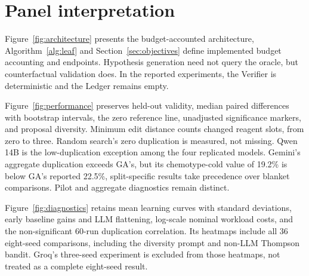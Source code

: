\section{Panel interpretation}
Figure~\ref{fig:architecture} presents the budget-accounted architecture, Algorithm~\ref{alg:leaf} and Section~\ref{sec:objectives} define implemented budget accounting and endpoints. Hypothesis generation need not query the oracle, but counterfactual validation does. In the reported experiments, the Verifier is deterministic and the Ledger remains empty.

Figure~\ref{fig:performance} preserves held-out validity, median paired differences with bootstrap intervals, the zero reference line, unadjusted significance markers, and proposal diversity. Minimum edit distance counts changed reagent slots, from zero to three. Random search's zero duplication is measured, not missing. Qwen 14B is the low-duplication exception among the four replicated models. Gemini's aggregate duplication exceeds GA's, but its chemotype-cold value of 19.2\% is below GA's reported 22.5\%, split-specific results take precedence over blanket comparisons. Pilot and aggregate diagnostics remain distinct.

Figure~\ref{fig:diagnostics} retains mean learning curves with standard deviations, early baseline gains and LLM flattening, log-scale nominal workload costs, and the non-significant 60-run duplication correlation. Its heatmaps include all 36 eight-seed comparisons, including the diversity prompt and non-LLM Thompson bandit. Groq's three-seed experiment is excluded from those heatmaps, not treated as a complete eight-seed result.

